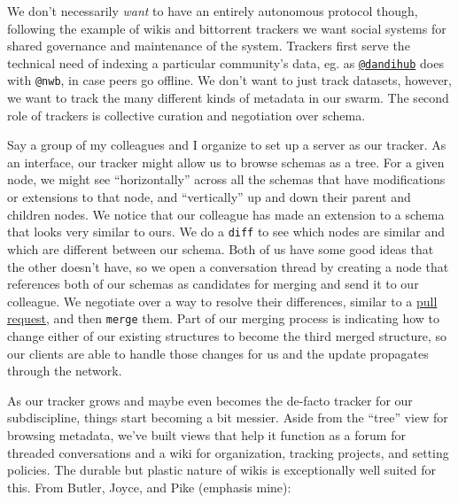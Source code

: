 We don't necessarily \emph{want} to have an entirely autonomous protocol
though, following the example of wikis and bittorrent trackers we want
social systems for shared governance and maintenance of the system.
Trackers first serve the technical need of indexing a particular
community's data, eg. as
\href{https://hub.dandiarchive.org}{\texttt{@dandihub}} does with
\texttt{@nwb}, in case peers go offline. We don't want to just track
datasets, however, we want to track the many different kinds of metadata
in our swarm. The second role of trackers is collective curation and
negotiation over schema.

Say a group of my colleagues and I organize to set up a server as our
tracker. As an interface, our tracker might allow us to browse schemas
as a tree. For a given node, we might see ``horizontally'' across all
the schemas that have modifications or extensions to that node, and
``vertically'' up and down their parent and children nodes. We notice
that our colleague has made an extension to a schema that looks very
similar to ours. We do a \texttt{diff} to see which nodes are similar
and which are different between our schema. Both of us have some good
ideas that the other doesn't have, so we open a conversation thread by
creating a node that references both of our schemas as candidates for
merging and send it to our colleague. We negotiate over a way to resolve
their differences, similar to a
\href{https://docs.github.com/en/pull-requests/collaborating-with-pull-requests/proposing-changes-to-your-work-with-pull-requests/about-pull-requests}{pull
request}, and then \texttt{merge} them. Part of our merging process is
indicating how to change either of our existing structures to become the
third merged structure, so our clients are able to handle those changes
for us and the update propagates through the network.

As our tracker grows and maybe even becomes the de-facto tracker for our
subdiscipline, things start becoming a bit messier. Aside from the
``tree'' view for browsing metadata, we've built views that help it
function as a forum for threaded conversations and a wiki for
organization, tracking projects, and setting policies. The durable but
plastic nature of wikis is exceptionally well suited for this. From
Butler, Joyce, and Pike (emphasis mine):

